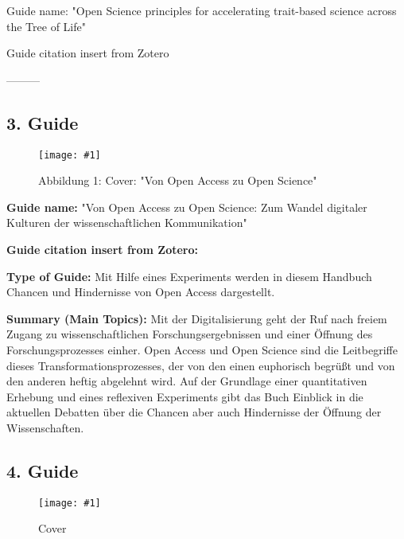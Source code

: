 \documentclass{article}
\newlength{\imgwidth}
\newcommand\scaledgraphics[2]{%
                
\settowidth{\imgwidth}{\texttt{[image: \#1]}}%
                
\setlength{\imgwidth}{\minof{\imgwidth}{#2\textwidth}}%
                
\texttt{[image: \#1]}%
                
}
\begin{document}
Guide name: "Open Science principles for accelerating trait-based science across the Tree of Life"


Guide citation insert from Zotero  \autocite{gallagher_open_2020}


---------


\subsection{3. Guide}\label{H9740541}



\begin{center}
\begin{figure}
\scaledgraphics{499c4719-8346-4a67-8a5b-fcacfb0ecde0.png}{0.5}
\caption*{Abbildung 1: Cover: "Von Open Access zu Open Science"}\label{F14991031}
\end{figure}


\end{center}





\textbf{Guide name:} "Von Open Access zu Open Science: Zum Wandel digitaler Kulturen der wissenschaftlichen Kommunikation"


\textbf{Guide citation insert from Zotero:}  \autocite{heise_von_2018}


\textbf{Type of Guide: }Mit Hilfe eines Experiments werden in diesem Handbuch Chancen und Hindernisse von Open Access dargestellt. 


\textbf{Summary (Main Topics): }Mit der Digitalisierung geht der Ruf nach freiem Zugang zu wissenschaftlichen Forschungsergebnissen und einer Öffnung des Forschungsprozesses einher. Open Access und Open Science sind die Leitbegriffe dieses Transformationsprozesses, der von den einen euphorisch begrüßt und von den anderen heftig abgelehnt wird. Auf der Grundlage einer quantitativen Erhebung und eines reflexiven Experiments gibt das Buch Einblick in die aktuellen Debatten über die Chancen aber auch Hindernisse der Öffnung der Wissenschaften.





\subsection{4. Guide}\label{H1144211}


\begin{figure}
\scaledgraphics{37cc2dfd-e350-4e29-acc3-9c7f815eb133.png}{0.5}
\caption*{Cover}\label{F36070241}
\end{figure}
\end{document}
